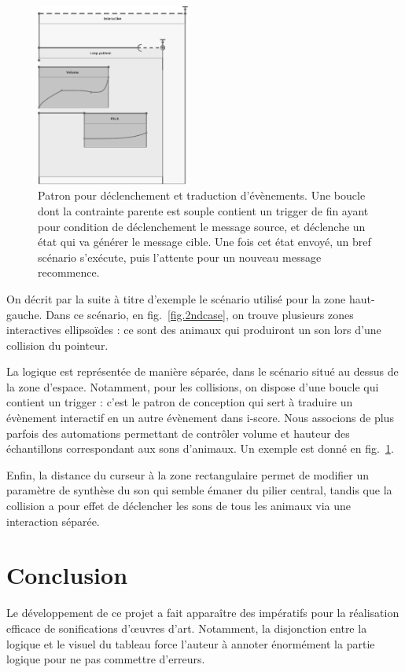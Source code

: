 \documentclass{article}
\begin{document}
    \begin{figure}
        \centering
        \includegraphics[height=6cm]{images/trigger.eps}
        \caption{Patron pour déclenchement et traduction d'évènements. Une boucle dont la contrainte parente est souple contient un trigger de fin ayant pour condition de déclenchement le message source, et déclenche un état qui va générer le message cible. Une fois cet état envoyé, un bref scénario s'exécute, puis l'attente pour un nouveau message recommence.}
        \label{fig.trigger}
    \end{figure}
    
    On décrit par la suite à titre d'exemple le scénario utilisé pour la zone haut-gauche.
    Dans ce scénario, en fig.~\ref{fig.2ndcase}, on trouve plusieurs zones interactives ellipsoïdes : ce sont des animaux qui produiront un son lors d'une collision du pointeur.
    
    La logique est représentée de manière séparée, dans le scénario situé au dessus de la zone d'espace.
    Notamment, pour les collisions, on dispose d'une boucle qui contient un trigger : c'est le patron de conception qui sert à traduire un évènement interactif en un autre évènement dans i-score. Nous associons de plus parfois des automations permettant de contrôler volume et hauteur des échantillons correspondant aux sons d'animaux. 
    Un exemple est donné en fig.~\ref{fig.trigger}.
    
    Enfin, la distance du curseur à la zone rectangulaire permet de modifier un paramètre de synthèse du son qui semble émaner du pilier central, tandis que la collision a pour effet de déclencher les sons de tous les animaux via une interaction séparée.
    
    \section*{Conclusion}
    Le développement de ce projet a fait apparaître des impératifs pour la réalisation efficace de sonifications d'\oe uvres d'art. 
    Notamment, la disjonction entre la logique et le visuel du tableau force l'auteur à annoter énormément la partie logique pour ne pas commettre d'erreurs.
    
\end{document}
